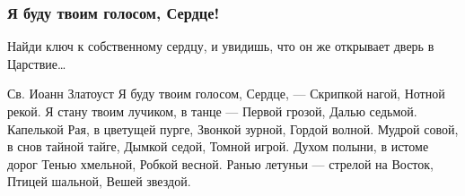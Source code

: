  
 
 

\subsubsection{Я буду твоим голосом, Сердце!}
\label{sec:poetry.rus.lelja_dalia.serdce}

Найди ключ к собственному сердцу,
и увидишь, что он же открывает дверь в Царствие…

Св. Иоанн Златоуст
Я буду твоим голосом, Сердце, —
Скрипкой нагой,
Нотной рекой.
Я стану твоим лучиком, в танце —
Первой грозой,
Далью седьмой.
Капелькой Рая, в цветущей пурге,
Звонкой зурной,
Гордой волной.
Мудрой совой, в снов тайной тайге,
Дымкой седой,
Томной игрой.
Духом полыни, в истоме дорог
Тенью хмельной,
Робкой весной.
Ранью летуньи --- стрелой на Восток,
Птицей шальной,
Вешей звездой.
